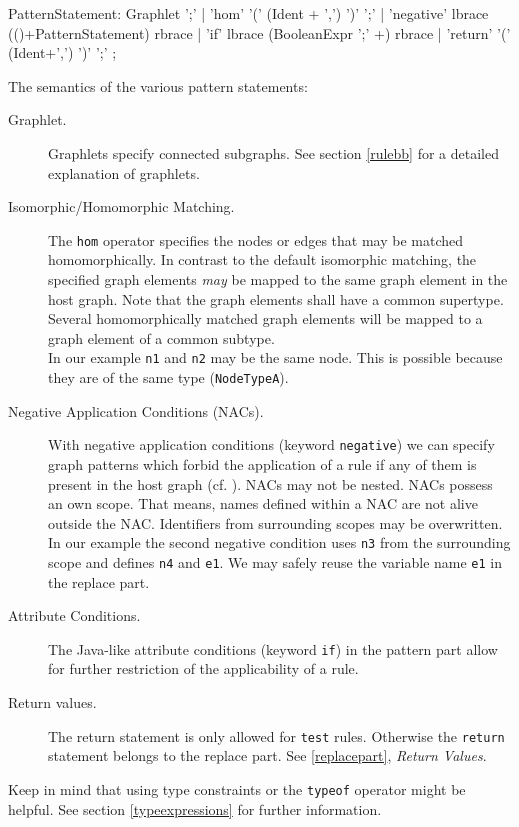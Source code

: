 \begin{rail}  
  PatternStatement: 
    Graphlet ';' |
    'hom' '(' (Ident + ',') ')' ';' |
    'negative' lbrace (()+PatternStatement) rbrace |
    'if' lbrace (BooleanExpr ';' +) rbrace |
    'return' '(' (Ident+',') ')' ';' ;
\end{rail}
The semantics of the various pattern statements:
\begin{description}
  \item[Graphlet.] Graphlets specify connected subgraphs. See section \ref{rulebb} for a detailed explanation of graphlets. 
  \item[Isomorphic/Homomorphic Matching.] The \texttt{hom} operator specifies the nodes or edges that may be matched homomorphically. In contrast to the default isomorphic matching, the specified graph elements \emph{may} be mapped to the same graph element in the host graph. Note that the graph elements shall have a common supertype. Several homomorphically matched graph elements will be mapped to a graph element of a common subtype.\\
  In our example \texttt{n1} and \texttt{n2} may be the same node. This is possible because they are of the same type (\texttt{NodeTypeA}).
  \item[Negative Application Conditions (NACs).] With negative application conditions (keyword \texttt{negative}) we can specify graph patterns which forbid the application of a rule if any of them is present in the host graph (cf. \cite{adam}). NACs may not be nested. NACs possess an own scope. That means, names defined within a NAC are not alive outside the NAC. Identifiers from surrounding scopes may be overwritten.\\
  In our example the second negative condition uses \texttt{n3} from the surrounding scope and defines \texttt{n4} and \texttt{e1}. We may safely reuse the variable name \texttt{e1} in the replace part.
  \item[Attribute Conditions.] The Java-like attribute conditions (keyword \texttt{if}) in the pattern part allow for further restriction of the applicability of a rule.
  \item[Return values.] The return statement is only allowed for \texttt{test} rules. Otherwise the \texttt{return} statement belongs to the replace part. See \ref{replacepart}, \emph{Return Values}.
\end{description}
Keep in mind that using type constraints or the \texttt{typeof} operator might be helpful. See section \ref{typeexpressions} for further information.

